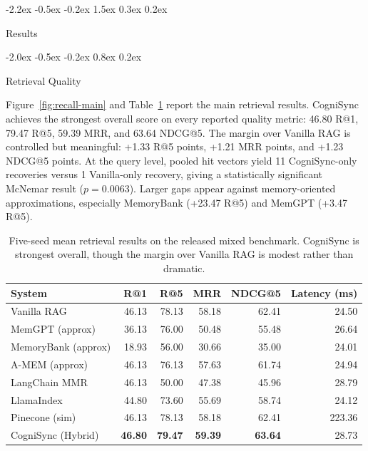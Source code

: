 \documentclass{article}
\makeatletter
\renewcommand{\section}{%
  \@startsection{section}{1}{\z@}%
                {-2.2ex \@plus -0.5ex \@minus -0.2ex}%
                { 1.5ex \@plus  0.3ex \@minus  0.2ex}%
                {\large\bf\raggedright}%
}
\renewcommand{\subsection}{%
  \@startsection{subsection}{2}{\z@}%
                {-2.0ex \@plus -0.5ex \@minus -0.2ex}%
                { 0.8ex \@plus  0.2ex}%
                {\normalsize\bf\raggedright}%
}
\makeatother
\begin{document}
\section{Results}

\subsection{Retrieval Quality}

Figure~\ref{fig:recall-main} and Table~\ref{tab:retrieval} report the main retrieval results. CogniSync achieves the strongest overall score on every reported quality metric: 46.80 R@1, 79.47 R@5, 59.39 MRR, and 63.64 NDCG@5. The margin over Vanilla RAG is controlled but meaningful: +1.33 R@5 points, +1.21 MRR points, and +1.23 NDCG@5 points. At the query level, pooled hit vectors yield 11 CogniSync-only recoveries versus 1 Vanilla-only recovery, giving a statistically significant McNemar result ($p=0.0063$). Larger gaps appear against memory-oriented approximations, especially MemoryBank (+23.47 R@5) and MemGPT (+3.47 R@5).

\begin{table}[t]
    \caption{Five-seed mean retrieval results on the released mixed benchmark. CogniSync is strongest overall, though the margin over Vanilla RAG is modest rather than dramatic.}
    \label{tab:retrieval}
    \centering
    \small
    \begin{tabular}{@{}lrrrrr@{}}
        \toprule
        \textbf{System} & \textbf{R@1} & \textbf{R@5} & \textbf{MRR} & \textbf{NDCG@5} & \textbf{Latency (ms)} \\
        \midrule
        Vanilla RAG         & 46.13 & 78.13 & 58.18 & 62.41 & 24.50 \\
        MemGPT (approx)     & 36.13 & 76.00 & 50.48 & 55.48 & 26.64 \\
        MemoryBank (approx) & 18.93 & 56.00 & 30.66 & 35.00 & 24.01 \\
        A-MEM (approx)      & 46.13 & 76.13 & 57.63 & 61.74 & 24.94 \\
        LangChain MMR       & 46.13 & 50.00 & 47.38 & 45.96 & 28.79 \\
        LlamaIndex          & 44.80 & 73.60 & 55.69 & 58.74 & 24.12 \\
        Pinecone (sim)      & 46.13 & 78.13 & 58.18 & 62.41 & 223.36 \\
        \midrule
        CogniSync (Hybrid)  & \textbf{46.80} & \textbf{79.47} & \textbf{59.39} & \textbf{63.64} & 28.73 \\
        \bottomrule
    \end{tabular}
\end{table}
\end{document}
